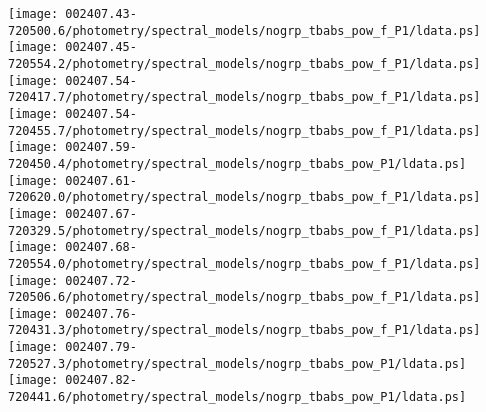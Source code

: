 \documentclass{aastex}
\begin{document}
\begin{figure*}[!ht]
\centering
\texttt{[image: 002407.43-720500.6/photometry/spectral\_models/nogrp\_tbabs\_pow\_f\_P1/ldata.ps]} \hfill 
\texttt{[image: 002407.45-720554.2/photometry/spectral\_models/nogrp\_tbabs\_pow\_f\_P1/ldata.ps]} \hfill 
\texttt{[image: 002407.54-720417.7/photometry/spectral\_models/nogrp\_tbabs\_pow\_f\_P1/ldata.ps]} \\ 
\vspace*{0.5in}
\texttt{[image: 002407.54-720455.7/photometry/spectral\_models/nogrp\_tbabs\_pow\_f\_P1/ldata.ps]} \hfill 
\texttt{[image: 002407.59-720450.4/photometry/spectral\_models/nogrp\_tbabs\_pow\_P1/ldata.ps]} \hfill 
\texttt{[image: 002407.61-720620.0/photometry/spectral\_models/nogrp\_tbabs\_pow\_f\_P1/ldata.ps]} \\ 
\vspace*{0.5in}
\texttt{[image: 002407.67-720329.5/photometry/spectral\_models/nogrp\_tbabs\_pow\_f\_P1/ldata.ps]} \hfill 
\texttt{[image: 002407.68-720554.0/photometry/spectral\_models/nogrp\_tbabs\_pow\_f\_P1/ldata.ps]} \hfill 
\texttt{[image: 002407.72-720506.6/photometry/spectral\_models/nogrp\_tbabs\_pow\_f\_P1/ldata.ps]} \\ 
\vspace*{0.5in}
\texttt{[image: 002407.76-720431.3/photometry/spectral\_models/nogrp\_tbabs\_pow\_f\_P1/ldata.ps]} \hfill 
\texttt{[image: 002407.79-720527.3/photometry/spectral\_models/nogrp\_tbabs\_pow\_P1/ldata.ps]} \hfill 
\texttt{[image: 002407.82-720441.6/photometry/spectral\_models/nogrp\_tbabs\_pow\_P1/ldata.ps]} \\ 
\vspace*{0.5in}
\end{figure*}
\clearpage
\end{document}
